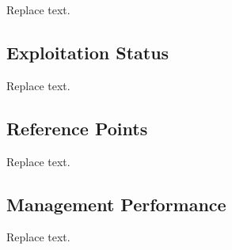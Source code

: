 \documentclass[11pt,
  english,
  a4paper,
]{article}
\begin{document}
\leavevmode\tagmcend\tagstructend


Replace text.

\leavevmode\tagmcend\tagstructend\par


\hypertarget{exploitation-status}{%
\subsection*{Exploitation Status}\label{exploitation-status}}

\leavevmode\tagmcend\tagstructend


Replace text.

\leavevmode\tagmcend\tagstructend\par


\hypertarget{reference-points}{%
\subsection*{Reference Points}\label{reference-points}}

\leavevmode\tagmcend\tagstructend


Replace text.

\leavevmode\tagmcend\tagstructend\par


\hypertarget{management-performance}{%
\subsection*{Management Performance}\label{management-performance}}

\leavevmode\tagmcend\tagstructend


Replace text.

\leavevmode\tagmcend\tagstructend\par
\end{document}
